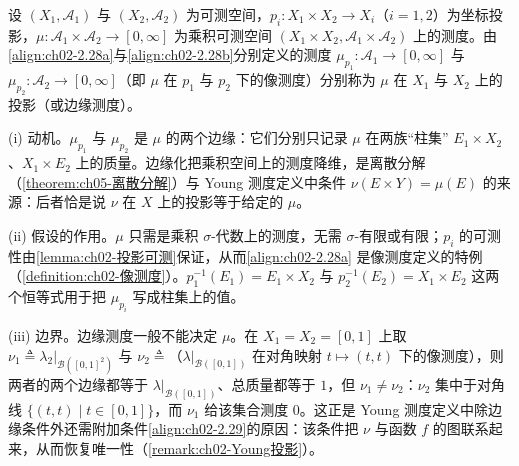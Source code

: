 \documentclass[../../main.tex]{subfiles}%
\begin{document}
\begin{definition}\label{definition:ch02-投影测度}
设 $(X_1,\mathscr A_1)$ 与 $(X_2,\mathscr A_2)$ 为可测空间，$p_i:X_1\times X_2\to X_i$（$i=1,2$）为坐标投影，$\mu:\mathscr A_1\times\mathscr A_2\to[0,\infty]$ 为乘积可测空间 $(X_1\times X_2,\mathscr A_1\times\mathscr A_2)$ 上的测度。由\eqref{align:ch02-2.28a}与\eqref{align:ch02-2.28b}分别定义的测度 $\mu_{p_1}:\mathscr A_1\to[0,\infty]$ 与 $\mu_{p_2}:\mathscr A_2\to[0,\infty]$（即 $\mu$ 在 $p_1$ 与 $p_2$ 下的像测度）分别称为 $\mu$ 在 $X_1$ 与 $X_2$ 上的投影（或边缘测度）。
\end{definition}

\begin{remark}\label{remark:ch02-投影测度动机}
(i) 动机。$\mu_{p_1}$ 与 $\mu_{p_2}$ 是 $\mu$ 的两个边缘：它们分别只记录 $\mu$ 在两族“柱集” $E_1\times X_2$、$X_1\times E_2$ 上的质量。边缘化把乘积空间上的测度降维，是离散分解（\cref{theorem:ch05-离散分解}）与 Young 测度定义中条件 $\nu(E\times Y)=\mu(E)$ 的来源：后者恰是说 $\nu$ 在 $X$ 上的投影等于给定的 $\mu$。

(ii) 假设的作用。$\mu$ 只需是乘积 $\sigma$-代数上的测度，无需 $\sigma$-有限或有限；$p_i$ 的可测性由\cref{lemma:ch02-投影可测}保证，从而\eqref{align:ch02-2.28a} 是像测度定义的特例（\cref{definition:ch02-像测度}）。$p_1^{-1}(E_1)=E_1\times X_2$ 与 $p_2^{-1}(E_2)=X_1\times E_2$ 这两个恒等式用于把 $\mu_{p_i}$ 写成柱集上的值。

(iii) 边界。边缘测度一般不能决定 $\mu$。在 $X_1=X_2=[0,1]$ 上取 $\nu_1\triangleq\lambda_2|_{\mathscr B([0,1]^2)}$ 与 $\nu_2\triangleq$（$\lambda|_{\mathscr B([0,1])}$ 在对角映射 $t\mapsto(t,t)$ 下的像测度），则两者的两个边缘都等于 $\lambda|_{\mathscr B([0,1])}$、总质量都等于 $1$，但 $\nu_1\neq\nu_2$：$\nu_2$ 集中于对角线 $\{(t,t)\mid t\in[0,1]\}$，而 $\nu_1$ 给该集合测度 $0$。这正是 Young 测度定义中除边缘条件外还需附加条件\eqref{align:ch02-2.29}的原因：该条件把 $\nu$ 与函数 $f$ 的图联系起来，从而恢复唯一性（\cref{remark:ch02-Young投影}）。
\end{remark}
\end{document}
